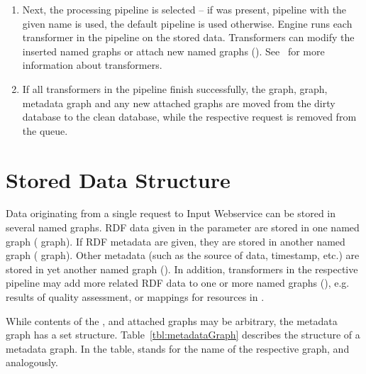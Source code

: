 \begin{enumerate}
  \item Next, the processing pipeline is selected -- if  was present, pipeline with the given name is used, the default pipeline is used otherwise. Engine runs each transformer in the pipeline on the stored data. Transformers can modify the inserted named graphs or attach new named graphs (). See~ for more information about transformers.

  \item If all transformers in the pipeline finish successfully, the  graph,  graph, metadata graph and any new attached graphs are moved from the dirty database to the clean database, while the respective request is removed from the queue.


\end{enumerate}

\section{Stored Data Structure}
\label{sec:storedDataStructure}

Data originating from a single request to Input Webservice can be stored in several named graphs. RDF data given in the  parameter are stored in one named graph ( graph). If  RDF metadata are given, they are stored in another named graph ( graph). Other metadata (such as the source of data, timestamp, etc.) are stored in yet another named graph (). In addition, transformers in the respective pipeline may add more related RDF data to one or more named graphs (), e.g. results of quality assessment, or mappings for resources in . 

While contents of the ,  and attached graphs may be arbitrary, the metadata graph has a set structure. Table~\ref{tbl:metadataGraph} describes the structure of a metadata graph. In the table,  stands for the name of the respective  graph,  and  analogously.


